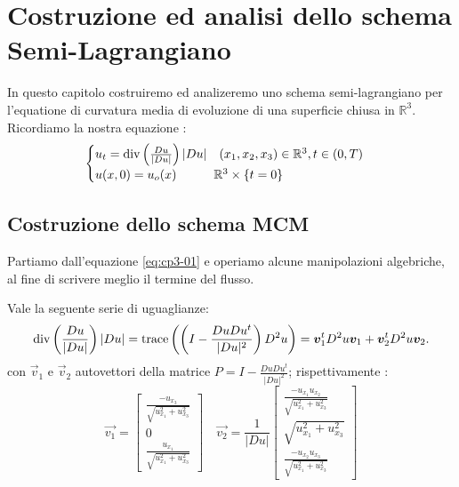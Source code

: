 \chapter{Costruzione ed analisi dello schema Semi-Lagrangiano}
In questo capitolo costruiremo ed analizeremo uno schema semi-lagrangiano per l'equatione di curvatura media di evoluzione di una superficie chiusa in $\mathbb{R}^3$.
Ricordiamo la nostra equazione :
\begin{equation}
\label{eq:cp3-01}
\begin{cases}
u_t = \operatorname{div}\left(\frac{Du}{|Du|}\right)|Du|\quad (x_1,x_2,x_3)\in\mathbb{R}^3,t\in(0,T) \\
u(x,0) = u_o(x) \qquad \quad \mathbb{R}^3\times\{t = 0\}
\end{cases}
\end{equation}
\section{Costruzione dello schema MCM}
Partiamo dall'equazione \eqref{eq:cp3-01} e operiamo alcune manipolazioni algebriche, al fine di scrivere meglio il termine del flusso. 
\begin{proposizione}
Vale la seguente serie di uguaglianze:
\[
\operatorname{div}\left(\frac{Du}{|Du|}\right)|Du|=\operatorname{trace}\left(\left(I-\frac{DuDu^t}{|Du|^2}\right)D^2u\right)=\bm{v}_1^tD^2u\bm{v}_1+\bm{v}_2^tD^2u\bm{v}_2.
\]
con $\vec{v}_1$ e $\vec{v}_2$ autovettori della matrice $P=I-\frac{DuDu^t}{|Du|^2}$; rispettivamente :
\[
\vec{v_1}=
\begin{bmatrix}
\frac{-u_{x_3}}{\sqrt{u_{x_1}^2+u_{x_3}^2}} \\
0 \\
\frac{u_{x_1}}{\sqrt{u_{x_1}^2+u_{x_3}^2}}
\end{bmatrix}
\quad
\vec{v_2}=\frac{1}{|Du|}
\begin{bmatrix}
\frac{-u_{x_1}u_{x_2}}{\sqrt{u_{x_1}^2+u_{x_3}^2}} \\
\sqrt{u_{x_1}^2+u_{x_3}^2} \\
\frac{-u_{x_2}u_{x_3}}{\sqrt{u_{x_1}^2+u_{x_3}^2}}
\end{bmatrix}
\]
\end{proposizione}
